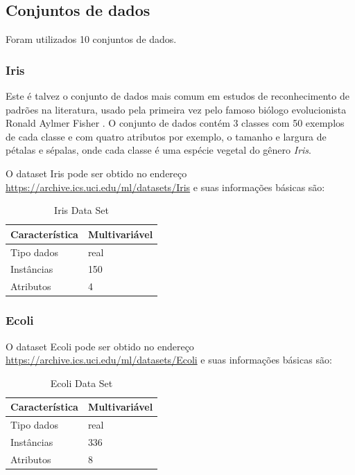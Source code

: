 \documentclass[12pt, a4paper, brazil]{article}
\begin{document}
\subsection{Conjuntos de dados}

Foram utilizados 10 conjuntos de dados.

\subsubsection{Iris}
Este é talvez o conjunto de dados mais comum em estudos de reconhecimento de padrões na literatura, usado pela primeira vez pelo famoso biólogo evolucionista Ronald Aylmer Fisher \citep{Fisher1936}. O conjunto de dados contém 3 classes com 50 exemplos de cada classe e com quatro atributos por exemplo, o tamanho e largura de pétalas e sépalas, onde cada classe é uma espécie vegetal do gênero \emph{Iris}.

O dataset Iris pode ser obtido no endereço \url{https://archive.ics.uci.edu/ml/datasets/Iris} e suas informações básicas são:
\begin{table}[!ht]
\centering
\caption{Iris Data Set}
\label{iristable}
\begin{tabular}{|l|l|}
\hline
Característica & Multivariável\\
\hline
Tipo dados & real\\
\hline
Instâncias & 150\\
\hline
Atributos & 4 \\
\hline
\end{tabular}
\end{table}

\subsubsection{Ecoli}
O dataset Ecoli pode ser obtido no endereço \url{https://archive.ics.uci.edu/ml/datasets/Ecoli} e suas informações básicas são:
\begin{table}[!ht]
\centering
\caption{Ecoli Data Set}
\label{ecolitable}
\begin{tabular}{|l|l|}
\hline
Característica & Multivariável\\
\hline
Tipo dados & real\\
\hline
Instâncias & 336\\
\hline
Atributos & 8 \\
\hline
\end{tabular}
\end{table}
\end{document}
